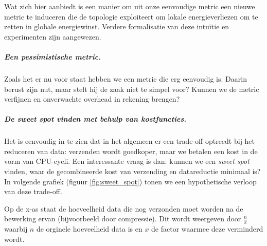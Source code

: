 \documentclass[11pt]{article}
\begin{document}
Wat zich hier aanbiedt is een manier om uit onze eenvoudige metric een nieuwe
metric te induceren die de topologie exploiteert om lokale energieverliezen om
te zetten in globale energiewinst. Verdere formalisatie van deze intu\"itie en
experimenten zijn aangewezen.

\subparagraph{Een pessimistische metric.}

Zoals het er nu voor staat hebben we een metric die erg eenvoudig is. Daarin
berust zijn nut, maar stelt hij de zaak niet te simpel voor? Kunnen we de metric
verfijnen en onverwachte overhead in rekening brengen? 


\subparagraph{De \textit{sweet spot} vinden met behulp van kostfuncties.}

Het is eenvoudig in te zien dat in het algemeen er een trade-off optreedt
bij het reduceren van data: verzenden wordt goedkoper, maar we betalen een kost
in de vorm van CPU-cycli. Een interessante vraag is dan: kunnen we een
\textit{sweet spot} vinden, waar de gecombineerde kost van verzending en
datareductie minimaal is?
\\
In volgende grafiek (figuur \ref{fig:sweet_spot}) tonen we een hypothetische
verloop van deze trade-off.



Op de x-as staat de hoeveelheid data die nog verzonden moet worden na de bewerking ervan (bijvoorbeeld door compressie). Dit wordt weergeven door $\frac{n}{x}$ waarbij $n$ de orginele hoeveelheid data is en $x$ de factor waarmee deze verminderd wordt. 
\end{document}
